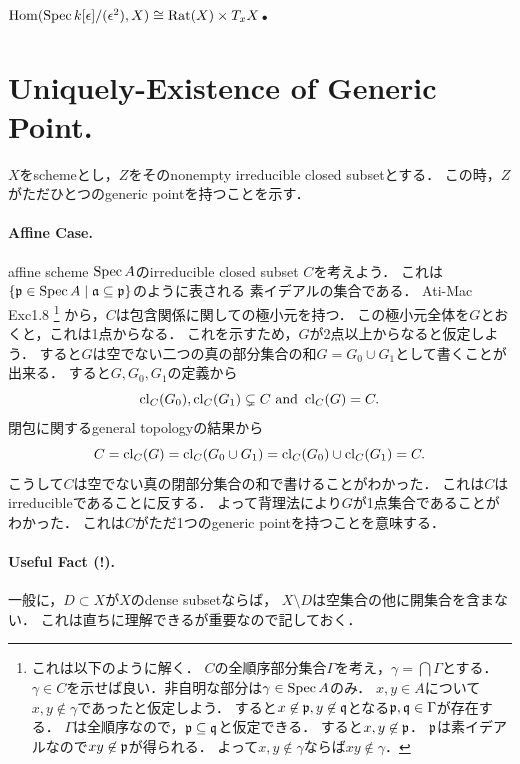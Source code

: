 \documentclass[a4paper]{jsarticle}
\newcommand{\Rat}{\operatorname{Rat}} %
\begin{document}
\section{$\Hom(\Spec k[\epsilon]/(\epsilon^2), X) \cong \Rat(X) \times T_x X$.} %

\section{Uniquely-Existence of Generic Point.} %
    $X$をschemeとし，$Z$をそのnonempty irreducible closed subsetとする．
    この時，$Z$がただひとつのgeneric pointを持つことを示す．

    \paragraph{Affine Case.}
    affine scheme $\operatorname{Spec} A$のirreducible closed subset $C$を考えよう．
    これは$\{ \mathfrak{p} \in \operatorname{Spec} A \mid \mathfrak{a} \subseteq \mathfrak{p} \}$のように表される
    素イデアルの集合である．
    Ati-Mac Exc1.8
    \footnote
    {
        これは以下のように解く．
        $C$の全順序部分集合$\Gamma$を考え，$\gamma=\bigcap \Gamma$とする．
        $\gamma \in C$を示せば良い．非自明な部分は$\gamma \in \operatorname{Spec} A$のみ．
        $x, y \in A$について$x, y \not \in \gamma$であったと仮定しよう．
        すると$x \not \in \mathfrak{p}, y \not \in \mathfrak{q}$となる$\mathfrak{p}, \mathfrak{q} \in \Gamma$が存在する．
        $\Gamma$は全順序なので，$\mathfrak{p} \subseteq \mathfrak{q}$と仮定できる．
        すると$x,y \not \in \mathfrak{p}$．
        $\mathfrak{p}$は素イデアルなので$xy \not \in \mathfrak{p}$が得られる．
        よって$x, y \not \in \gamma$ならば$xy \not \in \gamma$．
    }
    から，$C$は包含関係に関しての極小元を持つ．
    この極小元全体を$G$とおくと，これは1点からなる．
    これを示すため，$G$が2点以上からなると仮定しよう．
    すると$G$は空でない二つの真の部分集合の和$G=G_0 \cup G_1$として書くことが出来る．
    すると$G, G_0, G_1$の定義から
    \[ \operatorname{cl}_C(G_0), \operatorname{cl}_C(G_1) \subsetneq C \text{ and } \operatorname{cl}_C(G)=C. \]
    閉包に関するgeneral topologyの結果から
    \[ C=\operatorname{cl}_C(G)=\operatorname{cl}_C(G_0 \cup G_1)=\operatorname{cl}_C(G_0) \cup \operatorname{cl}_C(G_1)=C. \]
    こうして$C$は空でない真の閉部分集合の和で書けることがわかった．
    これは$C$はirreducibleであることに反する．
    よって背理法により$G$が1点集合であることがわかった．
    これは$C$がただ1つのgeneric pointを持つことを意味する．

    \paragraph{Useful Fact (!).}
    一般に，$D \subset X$が$X$のdense subsetならば，
    $X \setminus D$は空集合の他に開集合を含まない．
    これは直ちに理解できるが重要なので記しておく．
\end{document}
